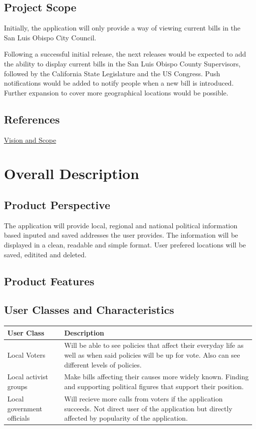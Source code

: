 \documentclass[12pt,oneside,letterpaper]{article}
\begin{document}
\subsection{Project Scope}
Initially, the application will only provide a way of viewing current bills in the San Luis Obispo City Council.

Following a successful initial release, the next releases would be expected to add the ability to display current bills in the San Luis Obispo County Supervisors, followed by the California State Legislature and the US Congress. Push notifications would be added to notify people when a new bill is introduced. Further expansion to cover more geographical locations would be possible.

\subsection{References}
\begin{compactenum}
\item\href{https://docs.google.com/document/d/1hyrRutAoTPR2VO-z9vAM3607bGrHKqxODCZUUu3c8WM/edit}{Vision and Scope}
\end{compactenum}

\section{Overall Description}
\subsection{Product Perspective}
The application will provide local, regional and national political information based inputed and saved addresses the user provides. The information will be displayed in a clean, readable and simple format. User prefered locations will be saved, editited and deleted.

\subsection{Product Features}

\subsection{User Classes and Characteristics}
\begin{longtable}{|l|p{3.8in}|}
\hline
\textbf{User Class}&\textbf{Description}\\
\hline
Local Voters & Will be able to see policies that affect their everyday life as well as when said policies will be up for vote. Also can see different levels of policies.\\
\hline
Local activist groups & Make bills affecting their causes more widely known. Finding and supporting political figures that support their position.\\
\hline
Local government officials & Will recieve more calls from voters if the application succeeds. Not direct user of the application but directly affected by popularity of the application.\\
\hline
\end{longtable}
\end{document}
